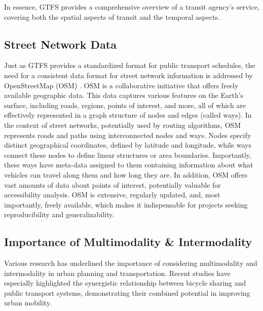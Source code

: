 
In essence, GTFS provides a comprehensive overview of a transit agency's service, covering both the spatial aspects of transit and the temporal aspects.

\subsection{Street Network Data}
\label{subsec:street_network_data}

Just as GTFS provides a standardized format for public transport schedules, the need for a consistent data format for street network information is addressed by OpenStreetMap (OSM) .
OSM is a collaborative initiative that offers freely available geographic data.
This data captures various features on the Earth's surface, including roads, regions, points of interest, and more, all of which are effectively represented in a graph structure of nodes and edges (called ways).
In the context of street networks, potentially used by routing algorithms, OSM represents roads and paths using interconnected nodes and ways.
Nodes specify distinct geographical coordinates, defined by latitude and longitude, while ways connect these nodes to define linear structures or area boundaries.
Importantly, these ways have meta-data assigned to them containing information about what vehicles can travel along them and how long they are.
In addition, OSM offers vast amounts of data about points of interest, potentially valuable for accessibility analysis.
OSM is extensive, regularly updated, and, most importantly, freely available, which makes it indispensable for projects seeking reproducibility and generalizability.


\subsection{Importance of Multimodality \& Intermodality}
\label{subsec:importance_of_multimodality_and_intermodality}
Various research has underlined the importance of considering multimodality and intermodality in urban planning and transportation.
Recent studies have especially highlighted the synergistic relationship between bicycle sharing and public transport systems, demonstrating their combined potential in improving urban mobility.

